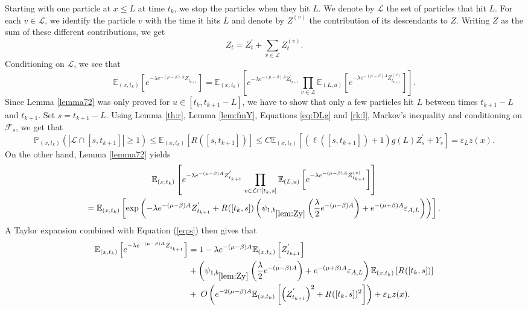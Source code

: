 \documentclass[11pt]{article}
\theoremstyle{plain}
\newcommand\vep{\varepsilon}
\begin{document}
Starting with one particle at $x\leqslant L$ at time $t_k$, we stop the particles when they hit $L$. 
We denote by $\mathcal{L}$ the set of particles that hit $L$. For each $v\in \mathcal{L}$, we identify the particle $v$ with the time it hits $L$ and  denote by $Z^{(v)}$ the contribution of its descendants to $Z$.  Writing $Z$ as the sum of these different contributions, we get
\begin{equation*}
Z^{}_t=Z^{'}_t+\sum_{v\in \mathcal{L}}Z^{(v)}_t.
\end{equation*}
Conditioning on $\mathcal{L}$, we see that
\begin{equation*}
\mathbb{E}_{(x,t_k)}\left[e^{-\lambda e^{-(\mu-\beta)A}Z^{}_{t_{k+1}}}\right]= \mathbb{E}_{(x,t_k)}\left[e^{-\lambda e^{-(\mu-\beta)A}Z^{'}_{t_{k+1}}}\prod_{v\in\mathcal{L}}\mathbb{E}_{(L,
u)}\left[e^{-\lambda e^{-(\mu-\beta)A} Z^{(v)}_{t_{k+1}}}\right]\right].\end{equation*}
Since Lemma \ref{lemma72} was only proved for $u\in [t_k,t_{k+1}-L]$, we have to show that only a few particles hit $L$ between times $t_{k+1}-L$ and $t_{k+1}$. Set $s= t_{k+1}-L$. Using Lemma \ref{th:r}, Lemma \ref{lem:fmY}, Equations \eqref{eq:DLg} and \eqref{rk:l},  Markov's inequality and conditioning on $\mathcal{F}_{s}$, we get that
\begin{equation}\label{eq:s}
\mathbb{P}_{(x,t_k)}\left(|\mathcal{L}\cap[s,t_{k+1}]|\geqslant 1\right)\leqslant\mathbb{E}_{(x,t_k)}\left[R([s,t_{k+1}])\right]\leqslant C\mathbb{E}_{(x,t_k)}\left[(\ell([s,t_{k+1}])+1)g(L)Z^{'}_s+Y_s\right]= \vep_Lz(x).
\end{equation}
On the other hand, Lemma \ref{lemma72} yields
\begin{multline*}
\mathbb{E}_{(x,t_k)}\left[e^{-\lambda e^{-(\mu-\beta)A}Z^{'}_{t_{k+1}}}\prod_{v\in\mathcal{L}\cap[t_k,s]}\mathbb{E}_{(L,
u)}\left[e^{-\lambda e^{-(\mu-\beta)A} Z^{(v)}_{t_{k+1}}}\right]\right]\\=\mathbb{E}_{(x,t_k)}\left[\exp\left(-\lambda e^{-(\mu-\beta)A}Z^{'}_{t_{k+1}}+R^{}([t_k,s])\left(\psi_{1,b_{\ref{lem:Zy}}}\left(\frac{\lambda}{2}e^{-(\mu-\beta) A}\right)+e^{-({\mu+\beta})A}\vep_{A,L}\right)\right)\right].
\end{multline*}
A Taylor expansion combined with Equation (\ref{eq:s}) then gives that
\begin{align}
\mathbb{E}_{(x,t_k)}\left[e^{-\lambda e^{-(\mu-\beta)A}Z^{}_{t_{k+1}}}\right]&=1-\lambda e^{-(\mu-\beta)A}\mathbb{E}_{(x,t_k)}\left[Z_{t_{k+1}}^{'}\right]\label{eq:TY}\\
&+\left(\psi_{1,b_{\ref{lem:Zy}}}\left(\frac{\lambda}{2}e^{-(\mu-\beta) A}\right)+e^{-({\mu+\beta})A}\vep_{A,L}\right)\mathbb{E}_{(x,t_k)}\left[R^{}([t_k,s])\right]\nonumber \\
&+\;O\left(e^{-2(\mu-\beta)A}\mathbb{E}_{(x,t_k)}\left[\left(Z^{'}_{t_{k+1}}\right)^2+R^{}([t_k,s])^2\right]\right)+\vep_Lz(x).\nonumber
\end{align}
\end{document}
